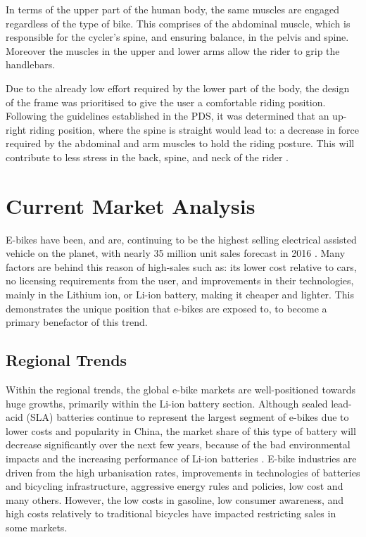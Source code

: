 \documentclass[a4paper,11pt]{article}
\begin{document}
In terms of the upper part of the human body, the same muscles are engaged regardless of the type of bike. This comprises of the abdominal muscle, which is responsible for the cycler's spine, and ensuring balance, in the pelvis and spine. Moreover the muscles in the upper and lower arms allow the rider to grip the handlebars. 

Due to the already low effort required by the lower part of the body, the design of the frame was prioritised to give the user a comfortable riding position. Following the guidelines established in the PDS, it was determined that an up-right riding position, where the spine is straight would lead to: a decrease in force required by the abdominal and arm muscles to hold the riding posture. This will contribute to less stress in the back, spine, and neck of the rider \cite{schwell05}.  

\section{Current Market Analysis}
\label{sec:CAA}

E-bikes have been, and are, continuing to be the highest selling electrical assisted vehicle on the planet, with nearly 35 million unit sales forecast in 2016 \cite{citron16}. Many factors are behind this reason of high-sales such as: its lower cost relative to cars, no licensing requirements from the user, and improvements in their technologies, mainly in the Lithium ion, or Li-ion battery, making it cheaper and lighter. This demonstrates the unique position that e-bikes are exposed to, to become a primary benefactor of this trend.

\subsection{Regional Trends}

Within the regional trends, the global e-bike markets are well-positioned towards huge growths, primarily within the Li-ion battery section. Although sealed lead-acid (SLA) batteries continue to represent the largest segment of e-bikes due to lower costs and popularity in China, the market share of this type of battery will decrease significantly over the next few years, because of the bad environmental impacts and the increasing performance of Li-ion batteries \cite{wood17}. E-bike industries are driven from the high urbanisation rates, improvements in technologies of batteries and bicycling infrastructure, aggressive energy rules and policies, low cost and many others. However, the low costs in gasoline, low consumer awareness, and high costs relatively to traditional bicycles have impacted restricting sales in some markets.
\end{document}

